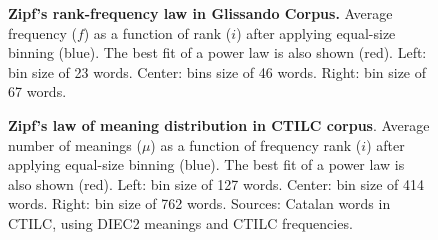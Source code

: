 \documentclass[10pt,letterpaper]{article}
\newif\ifarxiv
\begin{document}
\begin{figure}[!h]
\ifarxiv
\begin{minipage}{0.32\textwidth}
\centering
\texttt{[image: DIEC2\_GLISSANDO\_senseCG\_zipf\_grup\_1\_one\_plot\_nou\_LS.png]}
\end{minipage}
\hspace*{\fill}
\begin{minipage}{0.32\textwidth}
\centering
\texttt{[image: DIEC2\_GLISSANDO\_senseCG\_zipf\_grup\_5\_one\_plot\_nou\_LS.png]}
\end{minipage}
\hspace*{\fill}
\begin{minipage}{0.32\textwidth}
\centering
\texttt{[image: DIEC2\_GLISSANDO\_senseCG\_zipf\_grup\_10\_one\_plot\_nou\_LS.png]}
\end{minipage}
\fi
\caption{\textbf{Zipf's rank-frequency law in Glissando Corpus.} Average frequency ($f$) as a function of rank ($i$) after  applying equal-size binning (blue). The best fit of a power law is also shown (red). Left: bin size of 23 words. Center: bins size of 46 words. Right: bin size of 67 words.
}
\label{fig3}
\end{figure}


\begin{figure}[!h]
\ifarxiv
\begin{minipage}{0.32\textwidth}
\centering
\texttt{[image: DIEC2\_CTILC\_senseCG\_rank\_grup\_1\_one\_plot\_nou\_LS.png]}
\end{minipage}
\hspace*{\fill}
\begin{minipage}{0.32\textwidth}
\centering
\texttt{[image: DIEC2\_CTILC\_senseCG\_rank\_grup\_5\_one\_plot\_nou\_LS.png]}
\end{minipage}
\hspace*{\fill}
\begin{minipage}{0.32\textwidth}
\centering
\texttt{[image: DIEC2\_CTILC\_senseCG\_rank\_grup\_10\_one\_plot\_nou\_LS.png]}
\end{minipage}
\fi
\caption{\textbf{Zipf's law of meaning distribution in CTILC corpus}. Average number of meanings ($\mu$) as a function of frequency rank ($i$) after applying equal-size binning (blue). The best fit of a power law is also shown (red).
Left: bin size of 127 words. Center: bin size of 414 words. Right: bin size of 762 words. Sources: Catalan words in CTILC, using DIEC2 meanings and CTILC frequencies.}
\label{fig4}
\end{figure}
\end{document}

